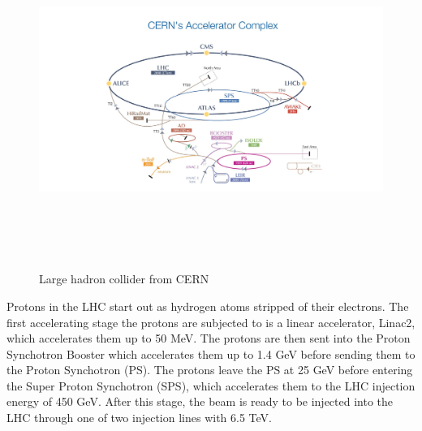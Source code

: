 \pagebreak

\begin{figure}[!htbp]
\centering
\includegraphics[width=17cm,height=11cm]{Chapter1/cern.jpg}
\caption{Large hadron collider from CERN\cite{cern1}} \label{lhc}
\end{figure}


Protons in the LHC start out as hydrogen atoms stripped of their electrons. The first accelerating stage the protons are subjected to is a linear accelerator, Linac2,
which accelerates them up to 50 MeV. The protons are then sent into the
Proton Synchotron Booster which accelerates them up to 1.4 GeV before sending them to the Proton Synchotron (PS). The protons leave the PS at 25 GeV before entering the Super Proton Synchotron (SPS), which accelerates them to the LHC injection energy of 450 GeV. After this stage, the beam is ready to be injected into
the LHC through one of two injection lines with 6.5 TeV.\cite{cern3}


